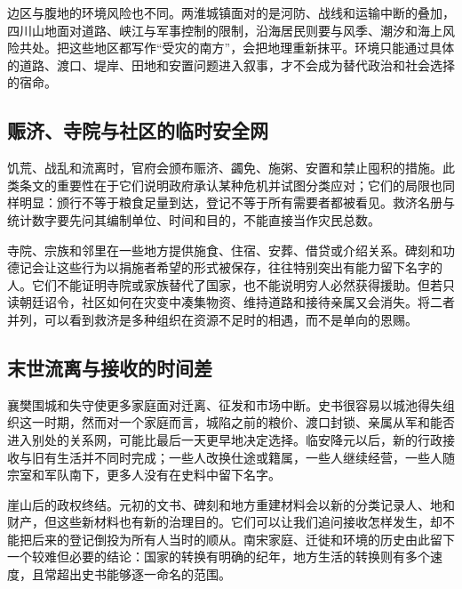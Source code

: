 边区与腹地的环境风险也不同。两淮城镇面对的是河防、战线和运输中断的叠加，四川山地面对道路、峡江与军事控制的限制，沿海居民则要与风季、潮汐和海上风险共处。把这些地区都写作“受灾的南方”，会把地理重新抹平。环境只能通过具体的道路、渡口、堤岸、田地和安置问题进入叙事，才不会成为替代政治和社会选择的宿命。

\subsection{赈济、寺院与社区的临时安全网}

饥荒、战乱和流离时，官府会颁布赈济、蠲免、施粥、安置和禁止囤积的措施。此类条文的重要性在于它们说明政府承认某种危机并试图分类应对；它们的局限也同样明显：颁行不等于粮食足量到达，登记不等于所有需要者都被看见。救济名册与统计数字要先问其编制单位、时间和目的，不能直接当作灾民总数。

寺院、宗族和邻里在一些地方提供施食、住宿、安葬、借贷或介绍关系。碑刻和功德记会让这些行为以捐施者希望的形式被保存，往往特别突出有能力留下名字的人。它们不能证明寺院或家族替代了国家，也不能说明穷人必然获得援助。但若只读朝廷诏令，社区如何在灾变中凑集物资、维持道路和接待亲属又会消失。将二者并列，可以看到救济是多种组织在资源不足时的相遇，而不是单向的恩赐。

\subsection{末世流离与接收的时间差}

襄樊围城和失守使更多家庭面对迁离、征发和市场中断。史书很容易以城池得失组织这一时期，然而对一个家庭而言，城陷之前的粮价、渡口封锁、亲属从军和能否进入别处的关系网，可能比最后一天更早地决定选择。临安降元以后，新的行政接收与旧有生活并不同时完成；一些人改换仕途或籍属，一些人继续经营，一些人随宗室和军队南下，更多人没有在史料中留下名字。

崖山后的政权终结。元初的文书、碑刻和地方重建材料会以新的分类记录人、地和财产，但这些新材料也有新的治理目的。它们可以让我们追问接收怎样发生，却不能把后来的登记倒投为所有人当时的顺从。南宋家庭、迁徙和环境的历史由此留下一个较难但必要的结论：国家的转换有明确的纪年，地方生活的转换则有多个速度，且常超出史书能够逐一命名的范围。
